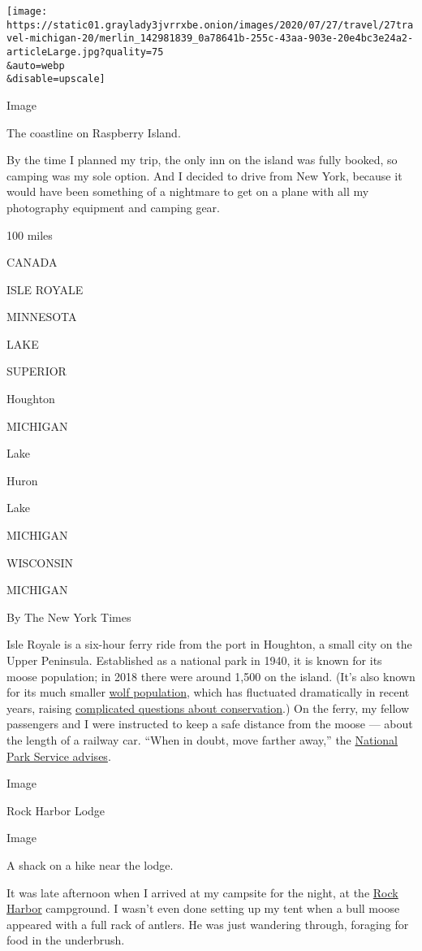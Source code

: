 \texttt{[image: https://static01.graylady3jvrrxbe.onion/images/2020/07/27/travel/27travel-michigan-20/merlin\_142981839\_0a78641b-255c-43aa-903e-20e4bc3e24a2-articleLarge.jpg?quality=75\\\&auto=webp\\\&disable=upscale]}

Image

The coastline on Raspberry Island.

By the time I planned my trip, the only inn on the island was fully
booked, so camping was my sole option. And I decided to drive from New
York, because it would have been something of a nightmare to get on a
plane with all my photography equipment and camping gear.

100 miles

CANADA

ISLE ROYALE

MINNESOTA

LAKE

SUPERIOR

Houghton

MICHIGAN

Lake

Huron

Lake

MICHIGAN

WISCONSIN

MICHIGAN

By The New York Times

Isle Royale is a six-hour ferry ride from the port in Houghton, a small
city on the Upper Peninsula. Established as a national park in 1940, it
is known for its moose population; in 2018 there were around 1,500 on
the island. (It's also known for its much smaller
\href{https://www.nps.gov/isro/learn/nature/wolf-moose-populations.htm}{wolf
population}, which has fluctuated dramatically in recent years, raising
\href{https://www.nytimes3xbfgragh.onion/2013/05/09/opinion/save-the-wolves-of-isle-royale-national-park.html}{complicated
questions about conservation}.) On the ferry, my fellow passengers and I
were instructed to keep a safe distance from the moose --- about the
length of a railway car. ``When in doubt, move farther away,'' the
\href{https://www.nps.gov/isro/learn/nature/moose.htm}{National Park
Service advises}.

Image

Rock Harbor Lodge

Image

A shack on a hike near the lodge.

It was late afternoon when I arrived at my campsite for the night, at
the \href{https://www.nps.gov/isro/planyourvisit/rock-harbor.htm}{Rock
Harbor} campground. I wasn't even done setting up my tent when a bull
moose appeared with a full rack of antlers. He was just wandering
through, foraging for food in the underbrush.

